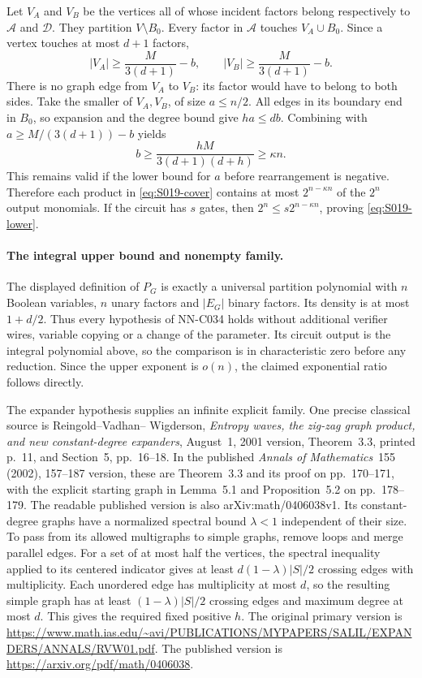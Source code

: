 Let $V_A$ and $V_B$ be the vertices all of whose incident
factors belong respectively to $\mathcal A$ and $\mathcal D$.
They partition $V\setminus B_0$. Every factor in
$\mathcal A$ touches $V_A\cup B_0$. Since a vertex touches
at most $d+1$ factors,
\[
 |V_A|\ge\frac{M}{3(d+1)}-b,
 \qquad |V_B|\ge\frac{M}{3(d+1)}-b.
\]
There is no graph edge from $V_A$ to $V_B$: its factor
would have to belong to both sides. Take the smaller of
$V_A,V_B$, of size $a\le n/2$. All edges in its boundary
end in $B_0$, so expansion and the degree bound give
$ha\le db$. Combining with
$a\ge M/(3(d+1))-b$ yields
\[
 b\ge\frac{hM}{3(d+1)(d+h)}\ge\kappa n.
\]
This remains valid if the lower bound for $a$ before
rearrangement is negative. Therefore each product in
\eqref{eq:S019-cover} contains at most $2^{n-\kappa n}$
of the $2^n$ output monomials. If the circuit has $s$ gates,
then $2^n\le s2^{n-\kappa n}$, proving
\eqref{eq:S019-lower}.

\paragraph{The integral upper bound and nonempty family.}
The displayed definition of $P_G$ is exactly a universal
partition polynomial with $n$ Boolean variables, $n$ unary
factors and $|E_G|$ binary factors. Its density is at most
$1+d/2$. Thus every hypothesis of NN-C034 holds without
additional verifier wires, variable copying or a change
of the parameter. Its circuit output is the integral
polynomial above, so the comparison is in characteristic
zero before any reduction. Since the upper exponent is
$o(n)$, the claimed exponential ratio follows directly.

The expander hypothesis supplies an infinite explicit
family. One precise classical source is Reingold--Vadhan--
Wigderson, \emph{Entropy waves, the zig-zag graph product,
and new constant-degree expanders}, August~1, 2001 version,
Theorem~3.3, printed p.~11, and Section~5, pp.~16--18. In the published \emph{Annals of Mathematics}~155 (2002), 157--187 version, these are Theorem~3.3 and its proof on pp.~170--171, with the explicit starting graph in Lemma~5.1 and Proposition~5.2 on pp.~178--179. The readable published version is also arXiv:math/0406038v1. Its constant-degree
graphs have a normalized spectral bound $\lambda<1$
independent of their size. To pass from its allowed
multigraphs to simple graphs, remove loops and merge
parallel edges. For a set of at most half the vertices,
the spectral inequality applied to its centered indicator
gives at least $d(1-\lambda)|S|/2$ crossing edges with
multiplicity. Each unordered edge has multiplicity at
most $d$, so the resulting simple graph has at least
$(1-\lambda)|S|/2$ crossing edges and maximum degree
at most $d$. This gives the required fixed positive $h$.
The original primary version is
\url{https://www.math.ias.edu/~avi/PUBLICATIONS/MYPAPERS/SALIL/EXPANDERS/ANNALS/RVW01.pdf}. The published version is
\url{https://arxiv.org/pdf/math/0406038}.

